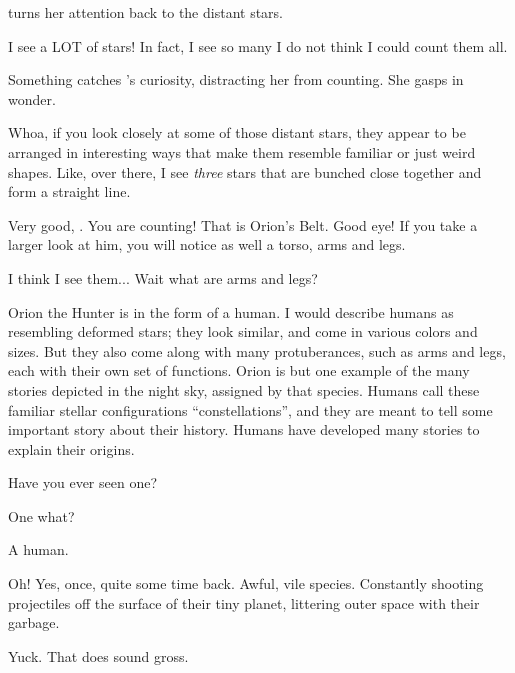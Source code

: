 \documentclass[main.tex]{subfiles}
\begin{document}
\par \nar \rmmaia turns her attention back to the distant stars.  

\par \Maia I see a LOT of stars!  In fact, I see so many I do not think I could count them all.

\par \nar Something catches \rmmaia's curiosity, distracting her from counting.  She gasps in wonder.

\par \Maia Whoa, if you look closely at some of those distant stars, they appear to be arranged in interesting ways that make them resemble familiar or just weird shapes.  Like, over there, I see \textit{three} stars that are bunched close together and form a straight line.

\par \Pleione Very good, \rmmaia.  You are counting!  That is Orion's Belt.  Good eye!  If you take a larger look at him, you will notice as well a torso, arms and legs.  

\par \Maia I think I see them... Wait what are arms and legs?  

\par \Pleione Orion the Hunter is in the form of a human.  I would describe humans as resembling deformed stars; they look similar, and come in various colors and sizes.  But they also come along with many protuberances, such as arms and legs, each with their own set of functions.   Orion is but one example of the many stories depicted in the night sky, assigned by that species.  Humans call these familiar stellar configurations ``constellations'', and they are meant to tell some important story about their history.  Humans have developed many stories to explain their origins.

\par \Maia Have you ever seen one?

\par \Pleione One what?

\par \Maia A human.

\par \Pleione Oh!  Yes, once, quite some time back.  Awful, vile species.  Constantly shooting projectiles off the surface of their tiny planet, littering outer space with their garbage.

\par \Maia Yuck.  That does sound gross.  
\end{document}
